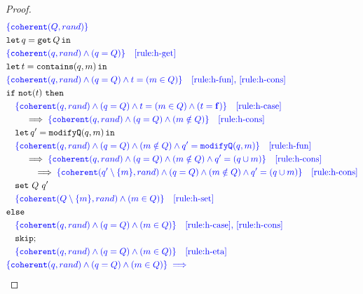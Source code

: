 \begin{proof}
\scriptsize{
\begin{align*}
\begin{aligned}
    & \color{blue} \{ \mathtt{coherent}(Q, rand) \} \\
    & \letin{q = \get Q}{} \\
    & \color{blue} \{ \mathtt{coherent}(q,rand) \land (q = Q) \} \quad \text{\ref{rule:h-get}} \\
    & \letin{t = \mathtt{contains}(q, m)}{} \\
    & \color{blue} \{ \mathtt{coherent}(q, rand) \land (q=Q) \land t=(m \in Q) \} \quad \text{\ref{rule:h-fun}, \ref{rule:h-cons}} \\
    & \mathtt{if}\ \mathtt{not}(t)\ \mathtt{then} \\
    & \quad \color{blue} \{ \mathtt{coherent}(q, rand) \land (q = Q) \land t=(m \in Q) \land (t = \false) \} \quad \text{\ref{rule:h-case}} \\
    & \qquad \implies \color{blue} \{ \mathtt{coherent}(q, rand) \land (q = Q) \land (m \notin Q) \} \quad \text{\ref{rule:h-cons}} \\
    & \quad \letin{q' = \mathtt{modifyQ}(q, m)}{} \\
    & \quad \color{blue} \{ \mathtt{coherent}(q, rand) \land (q=Q) \land (m \notin Q) \land q' = \mathtt{modifyQ}(q, m) \} \quad \text{\ref{rule:h-fun}} \\
    &\qquad \implies \color{blue} \{ \mathtt{coherent}(q, rand) \land (q=Q) \land (m \notin Q) \land q' = (q \cup m) \} \quad \text{\ref{rule:h-cons}} \\
    &\quad\qquad \implies \color{blue} \{ \mathtt{coherent}(q' \setminus \{m\}, rand) \land (q=Q) \land (m \notin Q) \land q' = (q \cup m) \} \quad \text{\ref{rule:h-cons}} \\
    & \quad \mathtt{set}\ Q\ q' \\
    & \quad \color{blue} \{ \mathtt{coherent}(Q \setminus \{m\}, rand) \land (m \in Q) \} \quad \text{\ref{rule:h-set}} \\
    & \mathtt{else} \\
    & \quad \color{blue} \{ \mathtt{coherent}(q, rand) \land (q=Q) \land (m \in Q) \} \quad \text{\ref{rule:h-case}, \ref{rule:h-cons}} \\
    & \quad \mathtt{skip}; \\
    & \quad \color{blue} \{\mathtt{coherent}(q, rand) \land (q=Q) \land (m \in Q) \} \quad \text{\ref{rule:h-eta}} \\
    & \color{blue} \{ \mathtt{coherent}(q, rand) \land (q=Q) \land (m \in Q) \} \implies \\

\end{aligned}
\end{align*}}
\end{proof}
